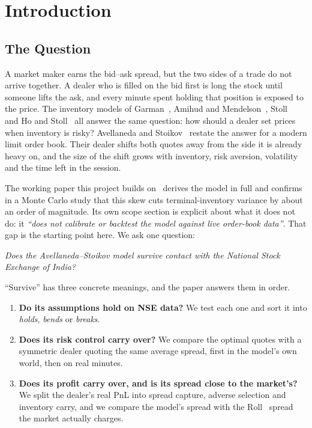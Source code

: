 \section{Introduction}

\subsection{The Question}

A market maker earns the bid--ask spread, but the two sides of a trade do not arrive together.
A dealer who is filled on the bid first is long the stock until someone lifts the ask, and every
minute spent holding that position is exposed to the price. The inventory models of
Garman~\cite{garman1976}, Amihud and Mendelson~\cite{amihudmendelson1980}, Stoll~\cite{stoll1978} and
Ho and Stoll~\cite{hostoll1981} all answer the same question: how should a dealer set prices when
inventory is risky? Avellaneda and Stoikov~\cite{avellaneda2008} restate the answer for a modern
limit order book. Their dealer shifts both quotes away from the side it is already heavy on, and
the size of the shift grows with inventory, risk aversion, volatility and the time left in the
session.

The working paper this project builds on~\cite{amargos2026} derives the model in full and confirms
in a Monte Carlo study that this skew cuts terminal-inventory variance by about an order of
magnitude. Its own scope section is explicit about what it does not do: it \emph{``does not
calibrate or backtest the model against live order-book data''}. That gap is the starting point
here. We ask one question:

\begin{center}
\emph{Does the Avellaneda--Stoikov model survive contact with the National Stock Exchange of India?}
\end{center}

\noindent ``Survive'' has three concrete meanings, and the paper answers them in order.
\begin{enumerate}
\item \textbf{Do its assumptions hold on NSE data?} We test each one and sort it into
  \emph{holds}, \emph{bends} or \emph{breaks}.
\item \textbf{Does its risk control carry over?} We compare the optimal quotes with a symmetric
  dealer quoting the same average spread, first in the model's own world, then on real minutes.
\item \textbf{Does its profit carry over, and is its spread close to the market's?} We split the
  dealer's real PnL into spread capture, adverse selection and inventory carry, and we compare the
  model's spread with the Roll~\cite{roll1984} spread the market actually charges.
\end{enumerate}


